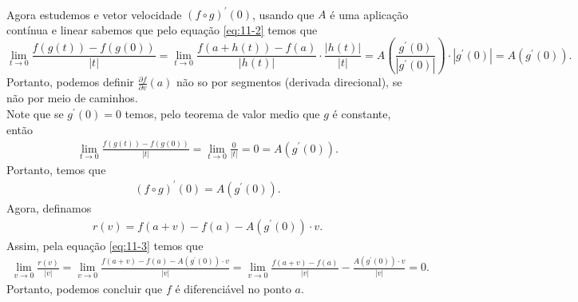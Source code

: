 \begin{homeworkProblem}[Seção 2-2]
\begin{solution}
\begin{align*}
    \end{align*}
    Agora estudemos e vetor velocidade $(f\circ g)^{\prime}(0)$, usando que $A$ é uma aplicação contínua e linear sabemos que pelo equação \eqref{eq:11-2} temos que
    \begin{equation}\label{eq:11-3}
      \lim_{t \to 0}\frac{f(g(t))-f(g(0))}{|t|}=\lim_{t \to 0}\frac{f(a+h(t))-f(a)}{|h(t)|}\cdot\frac{|h(t)|}{|t|}=A\left( \frac{g^{\prime}(0)}{|g^{\prime}(0)|} \right)\cdot |g^{\prime}(0)|=A(g^{\prime}(0)).
    \end{equation}
    Portanto, podemos definir $\frac{\partial f}{\partial v}(a)$ não so por segmentos (derivada direcional), se não por meio de caminhos.\\ 
    Note que se $g^{\prime}(0)=0$ temos, pelo teorema de valor medio que $g$ é constante, então 
    \begin{align*}
      \lim_{t \to 0}\frac{f(g(t))-f(g(0))}{|t|}=\lim_{t \to 0}\frac{0}{|t|}=0=A(g^{\prime}(0)).
    \end{align*}
    Portanto, temos que
    \begin{align*}
      (f\circ g)^{\prime}(0)=A(g^{\prime}(0)).
    \end{align*}
    Agora, definamos
    \begin{align*}
      r(v)=f(a+v)-f(a)-A(g^{\prime}(0))\cdot v.
    \end{align*}
    Assim, pela equação \eqref{eq:11-3} temos que
    \begin{align*}
      \lim_{v \to 0}\frac{r(v)}{|v|}=\lim_{v \to 0}\frac{f(a+v)-f(a)-A(g^{\prime}(0))\cdot v}{|v|}=\lim_{v \to 0}\frac{f(a+v)-f(a)}{|v|}-\frac{A(g^{\prime}(0))\cdot v}{|v|}=0.
    \end{align*}
    Portanto, podemos concluir que $f$ é diferenciável no ponto $a$. 
  \end{solution}
\end{homeworkProblem}
